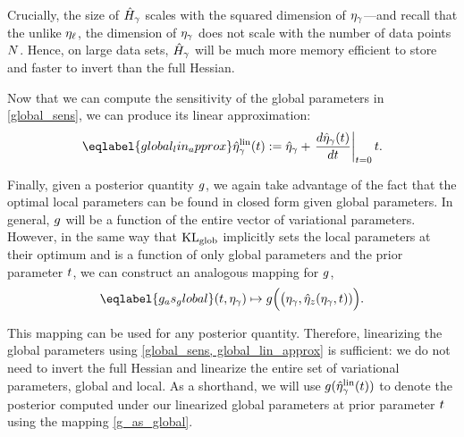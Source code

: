 Crucially, the size of $\hat{H}_\gamma$ scales with the squared dimension
of $\eta_{\gamma}$---and recall that the unlike $\eta_{\ell}$, the dimension of
$\eta_{\gamma}$ does not scale with the number of data points $N$.
Hence, on large data sets, $\hat{H}_\gamma$ will be much more memory efficient
to store and faster to invert than the full Hessian.

Now that we can compute the sensitivity of the global parameters in
\eqref{global_sens}, we can produce its linear approximation:
\begin{align}\eqlabel{global_lin_approx}
  \etalin_\gamma(\t) := \etaopt_\gamma +
  \fracat{d \etaopt_\gamma(\t)}{d \t}{\t=0} \t .
\end{align}

Finally, given a posterior quantity $g$,
we again take advantage of the fact that the optimal
local parameters can be found in closed form given global parameters.
In general, $g$ will be a function of the entire vector of variational parameters.
However, in the same way that $\mathrm{KL}_{\mathrm{glob}}$ implicitly sets the local parameters at their optimum
and is a function of only global parameters and the prior parameter $t$,
we can construct an analogous mapping for $g$,
\begin{align}\eqlabel{g_as_global}
(\t, \etaglob) \mapsto g\Big(\big(\etaglob, \etaoptz(\etaglob, \t))\Big).
\end{align}

This mapping can be used for any posterior quantity.
Therefore, linearizing the global parameters using \eqref{global_sens, global_lin_approx} is sufficient:
we do not need to invert the full Hessian
and linearize the entire set of variational parameters, global and local.
As a shorthand, we will use $g(\hat\eta^{\mathrm{lin}}_\gamma(t))$ to
denote the posterior computed under our linearized global parameters
at prior parameter $t$ using the mapping \eqref{g_as_global}.


%
%
%
%
%
%
%


